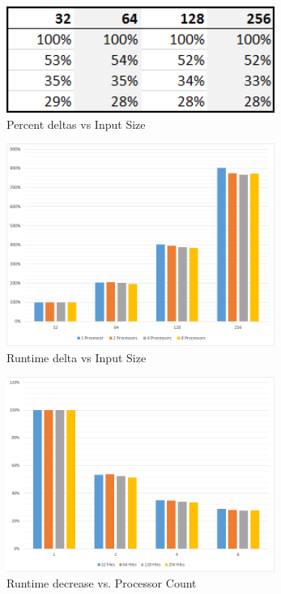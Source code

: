 \documentclass[report]{IEEEtran}
\begin{document}
\begin{figure}[h]
\centering
	\includegraphics[width = 8.75cm]{[image]DeltasperProcCount}
	\caption{Percent deltas vs Input Size}
		
\end{figure}

\begin{figure}[h]
\centering
	\includegraphics[width = 8.75cm]{[image]InputSizevsRuntime}
	\caption{Runtime delta vs Input Size}
		
\end{figure}

\begin{figure}[h]
\centering
	\includegraphics[width = 8.75cm]{[image]NumProcsvsRuntime}
	\caption{Runtime decrease vs. Processor Count}
		
\end{figure}
\end{document}
